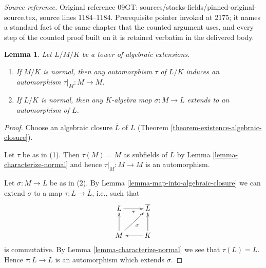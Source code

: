 \documentclass[10pt,a4paper]{amsart}
\theoremstyle{plain}
\newtheorem{lemma}[subsection]{Lemma}
\theoremstyle{definition}
\theoremstyle{remark}
\numberwithin{equation}{subsection}
\begin{document}
\noindent\textit{Source reference.} Original reference 09GT: sources/stacks-fields/pinned-original-source.tex, source lines 1184--1184. Prerequisite pointer invoked at 2175; it names a standard fact of the same chapter that the counted argument uses, and every step of the counted proof built on it is retained verbatim in the delivered body.\par\medskip
\begin{lemma}
\label{lemma-lift-maps}
Let $L/M/K$ be a tower of algebraic extensions.
\begin{enumerate}
\item If $M/K$ is normal, then any automorphism $\tau$ of $L/K$
induces an automorphism $\tau|_M : M \to M$.
\item If $L/K$ is normal, then any $K$-algebra map $\sigma : M \to L$
extends to an automorphism of $L$.
\end{enumerate}
\end{lemma}

\begin{proof}
Choose an algebraic closure $\overline{L}$ of $L$
(Theorem \ref{theorem-existence-algebraic-closure}).

\medskip\noindent
Let $\tau$ be as in (1). Then $\tau(M) = M$ as subfields of $\overline{L}$
by Lemma \ref{lemma-characterize-normal} and hence
$\tau|_M : M \to M$ is an automorphism.

\medskip\noindent
Let $\sigma : M \to L$ be as in (2).
By Lemma \ref{lemma-map-into-algebraic-closure}
we can extend $\sigma$ to a map
$\tau : L \to \overline{L}$, i.e., such that
$$
\xymatrix{
L \ar[r]_\tau & \overline{L} \\
M \ar[u] \ar[ru]_\sigma & K \ar[l] \ar[u]
}
$$
is commutative. By Lemma \ref{lemma-characterize-normal} we see that
$\tau(L) = L$. Hence $\tau : L \to L$ is an automorphism which
extends $\sigma$.
\end{proof}
\end{document}
